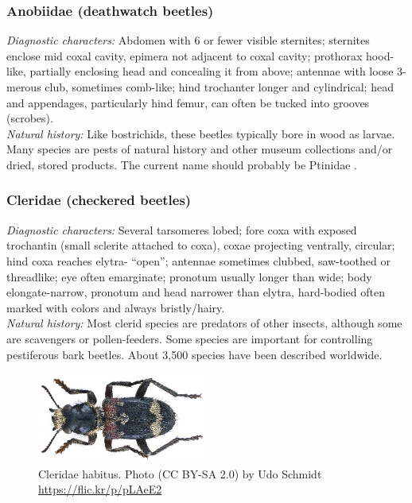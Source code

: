 \documentclass[letterpaper, 11pt]{article}
\begin{document}
\subsubsection{Anobiidae (deathwatch beetles)}
\noindent{}\textit{Diagnostic characters:} Abdomen with 6 or fewer visible sternites; sternites  enclose mid coxal cavity, epimera not adjacent to coxal cavity; prothorax hood-like, partially enclosing head and  concealing it from above; antennae with loose 3-merous club, sometimes comb-like; hind trochanter longer and cylindrical; head and appendages, particularly hind femur, can often be tucked into grooves (scrobes).\\

\noindent{}\textit{Natural history:} Like bostrichids, these beetles typically bore in wood as larvae. Many species are pests of natural history and other museum collections and/or dried, stored products. The current name should probably be Ptinidae \citep{arango2012death}.

\subsubsection{Cleridae (checkered beetles)}
\noindent{}\textit{Diagnostic characters:} Several tarsomeres lobed; fore coxa with exposed trochantin (small sclerite attached to coxa), coxae projecting ventrally, circular; hind coxa reaches elytra- ``open''; antennae sometimes clubbed, saw-toothed or threadlike; eye often emarginate; pronotum usually longer than wide; body elongate-narrow, pronotum and head narrower than elytra, hard-bodied often marked with colors and always bristly/hairy.\\

\noindent{}\textit{Natural history:} Most clerid species are predators of other insects, although some are scavengers or pollen-feeders. Some species are important for controlling pestiferous bark beetles. About 3,500 species have been described worldwide.

\begin{figure}[ht!]
  \centering
    \includegraphics[width=0.5\textwidth]{CleridHabitus}
  \caption{Cleridae habitus. Photo (CC BY-SA 2.0) by Udo Schmidt \url{https://flic.kr/p/pLAeE2}}
  \label{fig:clerid}
\end{figure}
\end{document}
